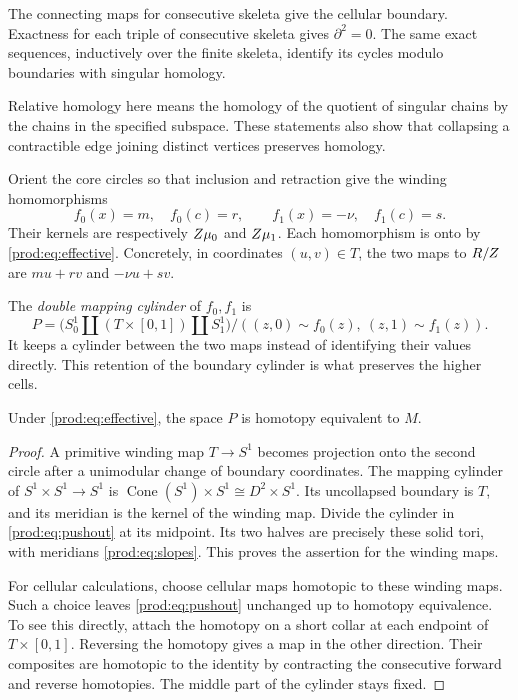 The connecting maps for consecutive skeleta give the cellular boundary.
Exactness for each triple of consecutive skeleta gives $\partial^2=0$.
The same exact sequences, inductively over the finite skeleta, identify
its cycles modulo boundaries with singular homology.

Relative homology here means the homology of the quotient of singular
chains by the chains in the specified subspace.  These statements also
show that collapsing a contractible edge joining distinct vertices
preserves homology.

Orient the core circles so that inclusion and retraction give the winding
homomorphisms
\begin{equation}\label{prod:eq:core-maps}
 f_0(x)=m,\quad f_0(c)=r,\qquad
 f_1(x)=-\nu,\quad f_1(c)=s.
\end{equation}
Their kernels are respectively $Z\mu_0$ and $Z\mu_1$.
Each homomorphism is onto by \eqref{prod:eq:effective}.
Concretely, in coordinates $(u,v)\in T$, the two maps to $R/Z$
are $mu+rv$ and $-\nu u+sv$.

The \emph{double mapping cylinder} of $f_0,f_1$ is
\begin{equation}\label{prod:eq:pushout}
 P=\bigl(S^1_0\amalg(T\times[0,1])\amalg S^1_1\bigr)/
       ((z,0)\sim f_0(z),\ (z,1)\sim f_1(z)).
\end{equation}
It keeps a cylinder between the two maps instead of identifying their
values directly.  This retention of the boundary cylinder is what
preserves the higher cells.

\begin{lemma}\label{prod:lem:geometric-cylinder}
Under \eqref{prod:eq:effective}, the space $P$ is homotopy equivalent to $M$.
\end{lemma}

\begin{proof}
A primitive winding map $T\to S^1$ becomes projection onto the second
circle after a unimodular change of boundary coordinates.
The mapping cylinder of $S^1\times S^1\to S^1$ is
$\operatorname{Cone}(S^1)\times S^1\cong D^2\times S^1$.
Its uncollapsed boundary is $T$, and its meridian is the kernel of the
winding map.  Divide the cylinder in \eqref{prod:eq:pushout} at its midpoint.
Its two halves are precisely these solid tori, with meridians
\eqref{prod:eq:slopes}.  This proves the assertion for the winding maps.

For cellular calculations, choose cellular maps homotopic to these
winding maps.  Such a choice leaves \eqref{prod:eq:pushout} unchanged up to
homotopy equivalence.  To see this directly, attach the homotopy on a short
collar at each endpoint of $T\times[0,1]$.  Reversing the homotopy gives
a map in the other direction.  Their composites are homotopic to the
identity by contracting the consecutive forward and reverse homotopies.
The middle part of the cylinder stays fixed.
\end{proof}

